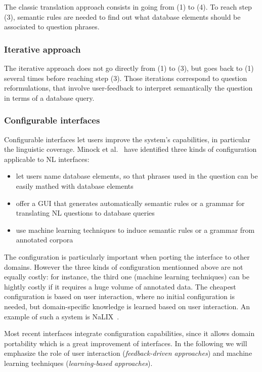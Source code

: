 \documentclass[10pt,journal,letterpaper,compsoc]{IEEEtran}
\begin{document}
The classic translation approach consists in going from (1) to (4).
To reach step (3), semantic rules are needed to find out what database elements
should be associated to question phrases. 

\subsubsection{Iterative approach}
The iterative approach does not go directly from (1) to (3), but goes back to
(1) several times before reaching step (3). 
Those iterations correspond to question reformulations, that involve
user-feedback to interpret semantically the question in terms of a database
query.

\subsubsection{Configurable interfaces}
Configurable interfaces let users improve the system's capabilities, in
particular the linguistic coverage. 
Minock et al.~\cite{Minock:2010:CSB:1715942.1716190} have identified three kinds
of configuration applicable to NL interfaces:
\begin{itemize}
  \item let users name database elements, so that phrases used in the question
  can be easily mathed with database elements
  \item offer a GUI that generates automatically semantic rules or a grammar for
  translating NL questions to database queries
  \item use machine learning techniques to induce semantic rules or a grammar
  from annotated corpora
\end{itemize}
The configuration is particularly important when porting the interface to other
domains. However the three kinds of configuration mentionned above are not
equally costly: for instance, the third one (machine learning techniques) can be
hightly costly if it requires a huge volume of annotated data. The cheapest
configuration is based on user interaction, where no initial configuration is
needed, but domain-specific knowledge is learned based on user interaction. An
example of such a system is {\sc NaLIX}~\cite{Li:2005:NIN:1066157.1066281}.

Most recent interfaces integrate configuration capabilities, since it allows
domain portability which is a great improvement of interfaces. In the following
we will emphasize the role of user interaction ({\it feedback-driven
approaches}) and machine learning techniques ({\it learning-based approaches}).
\end{document}
